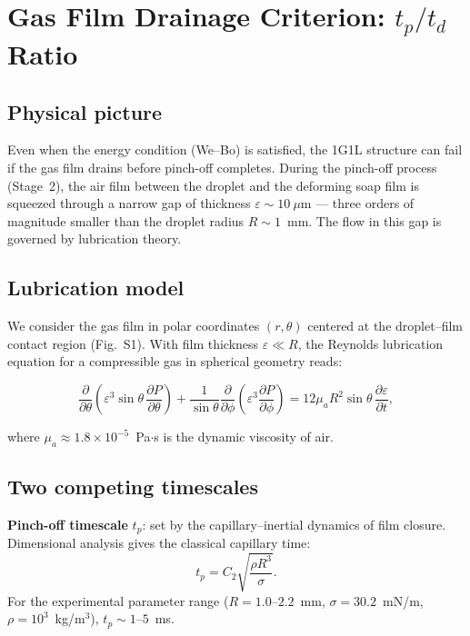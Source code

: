 \documentclass[%
 preprint,
 superscriptaddress,
 amsmath,amssymb,
 aps, prl,
]{revtex4-2}
\begin{document}
\section{Gas Film Drainage Criterion: $t_p/t_d$ Ratio}

\subsection{Physical picture}

Even when the energy condition (We--Bo) is satisfied, the 1G1L structure
can fail if the gas film drains before pinch-off completes.
During the pinch-off process (Stage~2), the air film between the droplet
and the deforming soap film is squeezed through a narrow gap of thickness
$\varepsilon \sim 10~\mu\text{m}$ --- three orders of magnitude smaller than
the droplet radius $R \sim 1$~mm.  The flow in this gap is governed by
lubrication theory.

\subsection{Lubrication model}

We consider the gas film in polar coordinates $(r, \theta)$ centered at the
droplet--film contact region (Fig.~S1).  With film thickness
$\varepsilon \ll R$, the Reynolds lubrication equation for a compressible
gas in spherical geometry reads:

\begin{equation}
\frac{\partial}{\partial\theta}\left(
\varepsilon^3 \sin\theta \,\frac{\partial P}{\partial\theta}
\right)
+ \frac{1}{\sin\theta}\frac{\partial}{\partial\phi}\left(
\varepsilon^3 \frac{\partial P}{\partial\phi}
\right)
= 12\mu_a R^2 \sin\theta \,\frac{\partial\varepsilon}{\partial t},
\end{equation}

where $\mu_a \approx 1.8\times10^{-5}$~Pa$\cdot$s is the dynamic viscosity of air.

\subsection{Two competing timescales}

\textbf{Pinch-off timescale} $t_p$: set by the capillary--inertial dynamics of
film closure.  Dimensional analysis gives the classical capillary time:
\begin{equation}
t_p = C_2 \sqrt{\frac{\rho R^3}{\sigma}}.
\end{equation}
For the experimental parameter range ($R = 1.0$--$2.2$~mm,
$\sigma = 30.2$~mN/m, $\rho = 10^3$~kg/m$^3$),
$t_p \sim 1$--$5$~ms.
\end{document}
